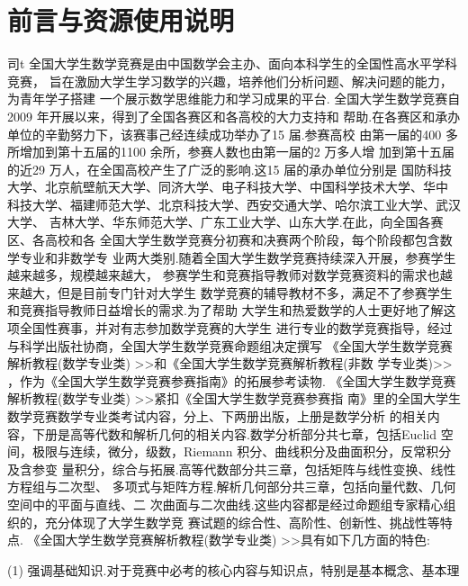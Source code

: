\chapter*{前言与资源使用说明}


\hypertarget{source-p005}{}
司t
全国大学生数学竞赛是由中国数学会主办、面向本科学生的全国性高水平学科竞赛，
旨在激励大学生学习数学的兴趣，培养他们分析问题、解决问题的能力，为青年学子搭建
一个展示数学思维能力和学习成果的平台.
全国大学生数学竞赛自2009 年开展以来，得到了全国各赛区和各高校的大力支持和
帮助.在各赛区和承办单位的辛勤努力下，该赛事己经连续成功举办了15 届.参赛高校
由第一届的400 多所增加到第十五届的1100 余所，参赛人数也由第一届的2 万多人增
加到第十五届的近29 万人，在全国高校产生了广泛的影响.这15 届的承办单位分别是
国防科技大学、北京航壁航天大学、同济大学、电子科技大学、中国科学技术大学、华中
科技大学、福建师范大学、北京科技大学、西安交通大学、哈尔滨工业大学、武汉大学、
吉林大学、华东师范大学、广东工业大学、山东大学.在此，向全国各赛区、各高校和各
全国大学生数学竞赛分初赛和决赛两个阶段，每个阶段都包含数学专业和非数学专
业两大类别.随着全国大学生数学竞赛持续深入开展，参赛学生越来越多，规模越来越大，
参赛学生和竞赛指导教师对数学竞赛资料的需求也越来越大，但是目前专门针对大学生
数学竞赛的辅导教材不多，满足不了参赛学生和竞赛指导教师日益增长的需求.为了帮助
大学生和热爱数学的人士更好地了解这项全国性赛事，并对有志参加数学竞赛的大学生
进行专业的数学竞赛指导，经过与科学出版社协商，全国大学生数学竞赛命题组决定撰写
《全国大学生数学竞赛解析教程(数学专业类) >>和《全国大学生数学竞赛解析教程(非数
学专业类)>> ，作为《全国大学生数学竞赛参赛指南》的拓展参考读物.
《全国大学生数学竞赛解析教程(数学专业类) >>紧扣《全国大学生数学竞赛参赛指
南》里的全国大学生数学竞赛数学专业类考试内容，分上、下两册出版，上册是数学分析
的相关内容，下册是高等代数和解析几何的相关内容.数学分析部分共七章，包括Euclid
空间，极限与连续，微分，级数，Riemann 积分、曲线积分及曲面积分，反常积分及含参变
量积分，综合与拓展.高等代数部分共三章，包括矩阵与线性变换、线性方程组与二次型、
多项式与矩阵方程.解析几何部分共三章，包括向量代数、几何空间中的平面与直线、二
次曲面与二次曲线.这些内容都是经过命题组专家精心组织的，充分体现了大学生数学竞
赛试题的综合性、高阶性、创新性、挑战性等特点.
《全国大学生数学竞赛解析教程(数学专业类) >>具有如下几方面的特色:
\par\noindent (1) 强调基础知识.对于竞赛中必考的核心内容与知识点，特别是基本概念、基本理


